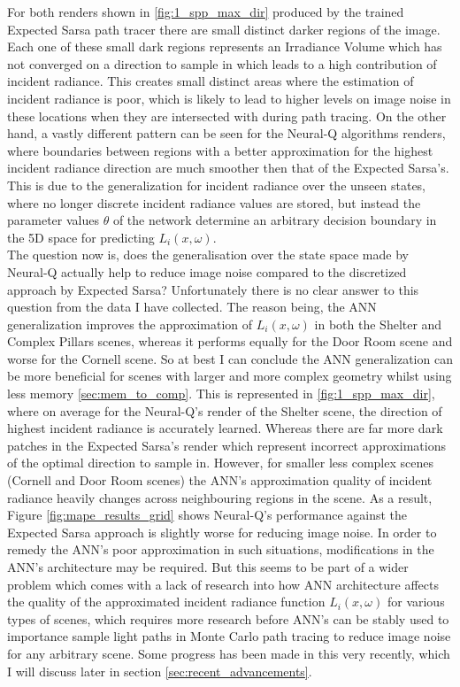 \documentclass[../dissertation.tex]{subfiles}
\begin{document}
For both renders shown in \ref{fig:1_spp_max_dir} produced by the trained Expected Sarsa path tracer there are small distinct darker regions of the image. Each one of these small dark regions represents an Irradiance Volume which has not converged on a direction to sample in which leads to a high contribution of incident radiance. This creates small distinct areas where the estimation of incident radiance is poor, which is likely to lead to higher levels on image noise in these locations when they are intersected with during path tracing. On the other hand, a vastly different pattern can be seen for the Neural-Q algorithms renders, where boundaries between regions with a better approximation for the highest incident radiance direction are much smoother then that of the Expected Sarsa's. This is due to the generalization for incident radiance over the unseen states, where no longer discrete incident radiance values are stored, but instead the parameter values $\theta$ of the network determine an arbitrary decision boundary in the 5D space for predicting $L_i(x, \omega)$.\\

The question now is, does the generalisation over the state space made by Neural-Q actually help to reduce image noise compared to the discretized approach by Expected Sarsa? Unfortunately there is no clear answer to this question from the data I have collected. The reason being, the ANN generalization improves the approximation of $L_i(x, \omega)$ in both  the Shelter and Complex Pillars scenes, whereas it performs equally for the Door Room scene and worse for the Cornell scene. So at best I can conclude the ANN generalization can be more  beneficial for scenes with larger and more complex geometry whilst using less memory \ref{sec:mem_to_comp}. This is represented  in \ref{fig:1_spp_max_dir}, where on average for the Neural-Q's render of the Shelter scene, the direction of highest incident radiance is accurately learned. Whereas there are far more dark patches  in the Expected Sarsa's render which represent incorrect approximations of the optimal direction to sample in. However, for smaller less complex scenes (Cornell and Door Room scenes) the ANN's approximation quality of incident radiance heavily changes across neighbouring regions in the scene. As a result, Figure \ref{fig:mape_results_grid} shows Neural-Q's performance against the Expected Sarsa approach is slightly worse for reducing image noise. In order to remedy the ANN's poor approximation in such situations, modifications in the ANN's architecture may be required. But this seems to be part of a wider problem which comes with a lack of research into how ANN architecture affects the quality of the approximated incident radiance function $L_i(x, \omega)$ for various types of scenes, which requires more research before ANN's can be stably used to importance sample light paths in Monte Carlo path tracing to reduce image noise for any arbitrary scene. Some progress has been made in this very recently, which I will discuss later in section \ref{sec:recent_advancements}.
\end{document}
